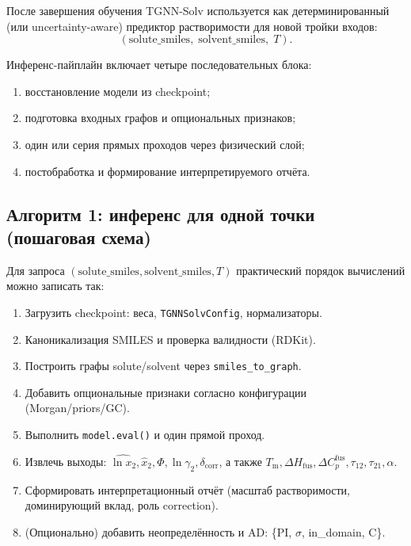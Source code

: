 \documentclass[11pt]{article}
\begin{document}
После завершения обучения TGNN-Solv используется как детерминированный (или uncertainty-aware) предиктор растворимости для новой тройки входов:
\begin{equation*}
(\mathrm{solute\_smiles},\; \mathrm{solvent\_smiles},\; T).
\end{equation*}

Инференс-пайплайн включает четыре последовательных блока:
\begin{enumerate}
  \item восстановление модели из checkpoint;
  \item подготовка входных графов и опциональных признаков;
  \item один или серия прямых проходов через физический слой;
  \item постобработка и формирование интерпретируемого отчёта.
\end{enumerate}

\subsection{Алгоритм 1: инференс для одной точки (пошаговая схема)}

Для запроса $(\mathrm{solute\_smiles},\mathrm{solvent\_smiles},T)$ практический порядок вычислений можно записать так:

\begin{enumerate}
  \item Загрузить checkpoint: веса, \texttt{TGNNSolvConfig}, нормализаторы.
  \item Каноникализация SMILES и проверка валидности (RDKit).
  \item Построить графы solute/solvent через \texttt{smiles\_to\_graph}.
  \item Добавить опциональные признаки согласно конфигурации (Morgan/priors/GC).
  \item Выполнить \texttt{model.eval()} и один прямой проход.
  \item Извлечь выходы: $\widehat{\ln x_2}, \hat{x}_2, \Phi, \ln\gamma_2, \delta_{\mathrm{corr}}$,  а также $T_{\mathrm{m}}, \Delta H_{\mathrm{fus}}, \Delta C_p^{\mathrm{fus}}, \tau_{12}, \tau_{21}, \alpha$.
  \item Сформировать интерпретационный отчёт (масштаб растворимости, доминирующий вклад, роль correction).
  \item (Опционально) добавить неопределённость и AD: \{PI, $\sigma$, in\_domain, C\}.
\end{enumerate}
\end{document}
